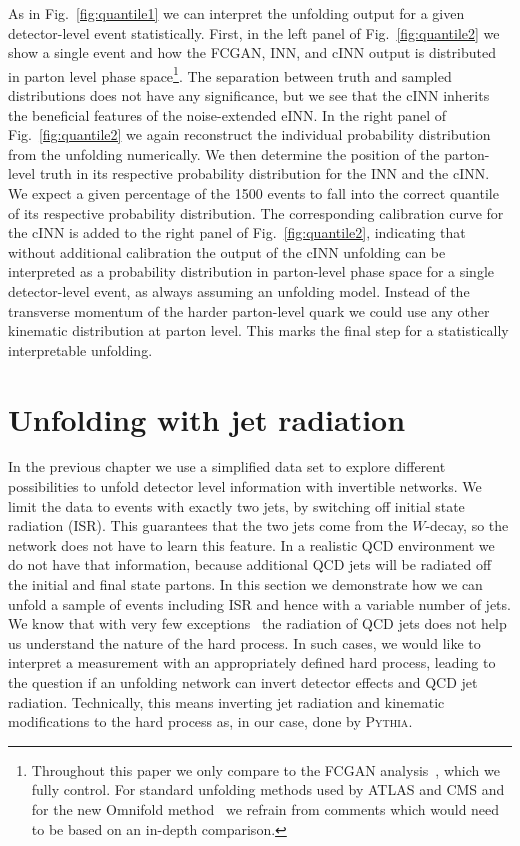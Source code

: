 As in Fig.~\ref{fig:quantile1} we can interpret the unfolding output
for a given detector-level event statistically. First, in the left
panel of Fig.~\ref{fig:quantile2} we show a single event and how the
FCGAN, INN, and cINN output is distributed in parton level phase
space\footnote{Throughout this paper we only compare to the FCGAN
  analysis~\cite{fcgan}, which we fully control. For standard
  unfolding methods used by ATLAS and CMS and for the new Omnifold
  method~\cite{Andreassen:2019cjw} we refrain from comments which
  would need to be based on an in-depth comparison.}. The separation
between truth and sampled distributions does not have any
significance, but we see that the cINN inherits the beneficial
features of the noise-extended eINN.  In the right panel of
Fig.~\ref{fig:quantile2} we again reconstruct the individual
probability distribution from the unfolding numerically. We then
determine the position of the parton-level truth in its respective
probability distribution for the INN and the cINN. We expect a given
percentage of the 1500 events to fall into the correct quantile of its
respective probability distribution. The corresponding calibration
curve for the cINN is added to the right panel of
Fig.~\ref{fig:quantile2}, indicating that without additional
calibration the output of the cINN unfolding can be interpreted as a
probability distribution in parton-level phase space for a single
detector-level event, as always assuming an unfolding model. Instead
of the transverse momentum of the harder parton-level quark we could
use any other kinematic distribution at parton level. This marks the
final step for a statistically interpretable unfolding.

\section{Unfolding with jet radiation}
\label{sec:jets}

In the previous chapter we use a simplified data set to explore
different possibilities to unfold detector level information with
invertible networks. We limit the data to events with exactly two
jets, by switching off initial state radiation (ISR). This guarantees
that the two jets come from the $W$-decay, so the network does not
have to learn this feature. In a realistic QCD environment we do not
have that information, because additional QCD jets will be radiated
off the initial and final state partons. In this section we
demonstrate how we can unfold a sample of events including ISR and
hence with a variable number of jets. We know that with very few
exceptions~\cite{Plehn:2001nj,Buckley:2014fqa} the radiation of QCD
jets does not help us understand the nature of the hard process. In
such cases, we would like to interpret a measurement with an
appropriately defined hard process, leading to the question if an
unfolding network can invert detector effects and QCD jet
radiation. Technically, this means inverting jet radiation and
kinematic modifications to the hard process as, in our case, done by
\textsc{Pythia}.

